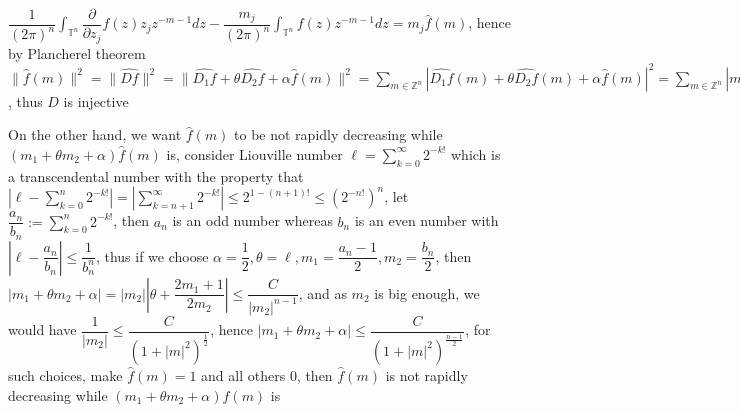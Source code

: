 \documentclass[../main.tex]{subfiles}
\begin{document}
$\dfrac{1}{(2\pi)^n}\int_{\mathbb{T}^n}\dfrac{\partial}{\partial z_j}f(z)z_jz^{-m-1}dz-\dfrac{m_j}{(2\pi)^n}\int_{\mathbb{T}^n}f(z)z^{-m-1}dz=m_j\widehat{f}(m)$, hence by Plancherel theorem
$\|\widehat{f}(m)\|^2=\|\widehat{Df}\|^2=\|\widehat{D_1f}+\theta\widehat{D_2f}+\alpha \widehat{f}(m)\|^2=\sum_{m\in\mathbb{Z}^n}|\widehat{D_1f}(m)+\theta\widehat{D_2f}(m)+\alpha \widehat{f}(m)|^2=\sum_{m\in\mathbb{Z}^n}|m_1\widehat{f}+\theta m_2\widehat{f}+\alpha \widehat{f}(m)|^2=\sum_{m\in\mathbb{Z}^n}|m_1+\theta m_2+\alpha|^2|\widehat{f}(m)|^2$, thus $D$ is injective \par
On the other hand, we want $\widehat{f}(m)$ to be not rapidly decreasing while $(m_1+\theta m_2+\alpha)\widehat{f}(m)$ is, consider Liouville number $\ell=\sum_{k=0}^{\infty}2^{-k!}$ which is a transcendental number with the property that $\left|\ell - \sum_{k=0}^{n}2^{-k!}\right|=\left|\sum_{k=n+1}^{\infty}2^{-k!}\right|\leq2^{1-(n+1)!}\leq\left(2^{-n!}\right)^n$, let $\dfrac{a_n}{b_n}:=\sum_{k=0}^{n}2^{-k!}$, then $a_n$ is an odd number whereas $b_n$ is an even number with $\left|\ell - \dfrac{a_n}{b_n}\right|\leq\dfrac{1}{b_n^n}$, thus if we choose $\alpha=\dfrac{1}{2}, \theta=\ell, m_1=\dfrac{a_n-1}{2}, m_2=\dfrac{b_n}{2}$, then $|m_1+\theta m_2+\alpha|=|m_2|\left|\theta + \dfrac{2m_1+1}{2m_2}\right|\leq\dfrac{C}{|m_2|^{n-1}}$, and as $m_2$ is big enough, we would have $\dfrac{1}{|m_2|}\leq\dfrac{C}{\left(1+|m|^2\right)^{\frac{1}{2}}}$, hence $|m_1+\theta m_2+\alpha|\leq\dfrac{C}{\left(1+|m|^2\right)^{\frac{n-1}{2}}}$, for such choices, make $\widehat{f}(m)=1$ and all others $0$, then $\widehat{f}(m)$ is not rapidly decreasing while $(m_1+\theta m_2+\alpha)\widehat{f}(m)$ is \par
\end{document}
